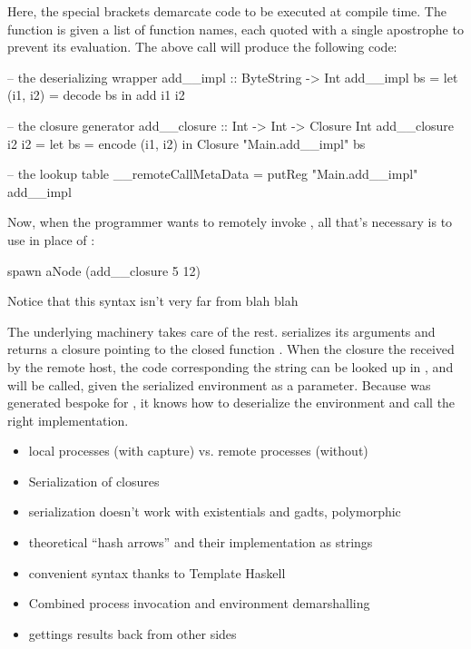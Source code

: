 \documentclass[preprint]{sigplanconf}
\begin{document}

Here, the special brackets \textt{\$( )} demarcate code to be executed at compile time. The  function is given a list of function names, each quoted with a single apostrophe to prevent its evaluation. The above  call will produce the following code:

\begin{code}
-- the deserializing wrapper
add__impl :: ByteString -> Int
add__impl bs = let (i1, i2) = decode bs
                in add i1 i2

-- the closure generator
add__closure :: Int -> Int -> Closure Int
add__closure i2 i2 = let bs = encode (i1, i2)
                      in Closure "Main.add__impl" bs

-- the lookup table
__remoteCallMetaData = putReg "Main.add__impl" add__impl
\end{code}

Now, when the programmer wants to remotely invoke , all that's necessary is to use  in place of :

\begin{code}
spawn aNode (add__closure 5 12)
\end{code}

Notice that this syntax isn't very far from blah blah

The underlying machinery takes care of the rest.  serializes its arguments and returns a closure pointing to the closed function . When the closure the received by the remote host, the code corresponding the string  can be looked up in , and  will be called, given the serialized environment as a parameter. Because  was generated bespoke for , it knows how to deserialize the environment and call the right implementation.

\begin{itemize}
\item local processes (with capture) vs. remote processes (without)
\item Serialization of closures
\item serialization doesn't work with existentials and gadts, polymorphic
\item theoretical ``hash arrows'' and their implementation as strings
\item convenient syntax thanks to Template Haskell
\item Combined process invocation and environment demarshalling
\item gettings results back from other sides
\end{itemize}
\end{document}
